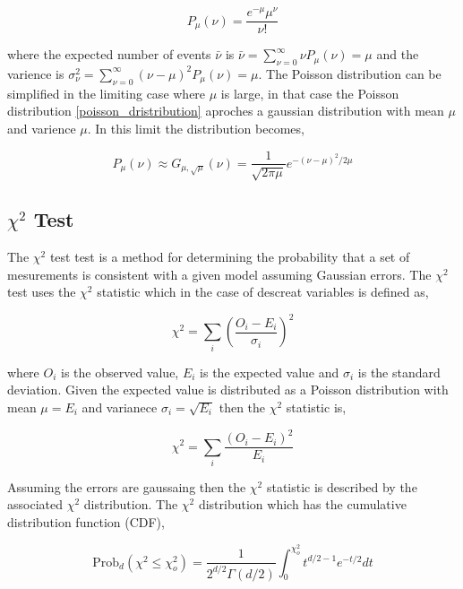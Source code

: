 \documentclass[%
 reprint,
 amsmath,amssymb,
 aps,
]{revtex4-1}
\begin{document}
\begin{equation}
P_\mu(\nu)=\frac{e^{-\mu}\mu^\nu}{\nu!}
\label{poisson_dristribution}
\end{equation}

where the expected number of events $\bar{\nu}$ is $\bar{\nu}=\sum_{\nu=0}^\infty \nu P_\mu(\nu)=\mu$ and the varience is $\sigma_\nu^2=\sum_{\nu=0}^\infty(\nu-\mu)^2P_\mu(\nu) = \mu$. The Poisson distribution can be simplified in the limiting case where $\mu$ is large, in that case the Poisson distribution \eqref{poisson_dristribution} aproches a gaussian distribution with mean $\mu$ and varience $\mu$. In this limit the distribution becomes,

\begin{equation}
P_\mu(\nu)\approx G_{\mu, \sqrt{\mu}}(\nu)=\frac{1}{\sqrt{2\pi\mu}}e^{-(\nu-\mu)^2/2\mu}
\label{poisson_gaussian_limit}
\end{equation}

\subsection{$\chi^2$ Test}
The $\chi^2$ test test is a method for determining the probability that a set of mesurements is consistent with a given model assuming Gaussian errors. The $\chi^2$ test uses the $\chi^2$ statistic which in the case of descreat variables is defined as,

\[
\chi^2=\sum_{i}\left(\frac{O_i - E_i}{\sigma_i}\right)^2
\]

where $O_i$ is the observed value, $E_i$ is the expected value and $\sigma_i$ is the standard deviation. Given the expected value is distributed as a Poisson distribution with mean $\mu=E_i$ and varianece $\sigma_i=\sqrt{E_i}$ then the $\chi^2$ statistic is,

\begin{equation}
\chi^2=\sum_{i}\frac{\left(O_i - E_i\right)^2}{E_i}
\label{chi_squared_statistic}
\end{equation}

Assuming the errors are gaussaing then the $\chi^2$ statistic is described by the associated $\chi^2$ distribution. The $\chi^2$ distribution which has the cumulative distribution function (CDF),

\begin{equation}
\text{Prob}_d(\chi^2 \leq \chi_o^2)=\frac{1}{2^{d/2}\Gamma(d/2)}\int_0^{\chi_o^2} t^{d/2-1}e^{-t/2}dt
\label{chi_squared_prob}
\end{equation}
\end{document}
